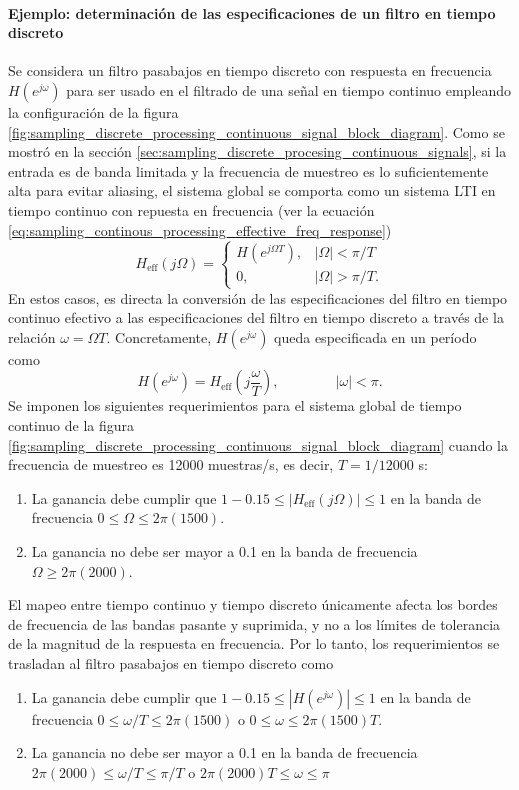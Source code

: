 \documentclass[a4paper]{report}
\begin{document}
\paragraph{Ejemplo: determinación de las especificaciones de un filtro en tiempo discreto} Se considera un filtro pasabajos en tiempo discreto con respuesta en frecuencia \(H(e^{j\omega})\) para ser usado en el filtrado de una señal en tiempo continuo empleando la configuración de la figura \ref{fig:sampling_discrete_processing_continuous_signal_block_diagram}. Como se mostró en la sección \ref{sec:sampling_discrete_procesing_continuous_signals}, si la entrada es de banda limitada y la frecuencia de muestreo es lo suficientemente alta para evitar aliasing, el sistema global se comporta como un sistema LTI en tiempo continuo con repuesta en frecuencia (ver la ecuación \ref{eq:sampling_continous_processing_effective_freq_response})
\[
 H_\textrm{eff}(j\Omega)
 =\left\{
  \begin{array}{ll}
   H(e^{j\Omega T}), & |\Omega|<\pi/T \\
   0, & |\Omega|>\pi/T.
  \end{array}
  \right. 
\]
En estos casos, es directa la conversión de las especificaciones del filtro en tiempo continuo efectivo a las especificaciones del filtro en tiempo discreto a través de la relación \(\omega=\Omega T\). Concretamente, \(H(e^{j\omega})\) queda especificada en un período como
\[
 H(e^{j\omega})=H_\textrm{eff}\left(j\frac{\omega}{T}\right),
 \qquad\qquad 
 |\omega|<\pi.
\]
Se imponen los siguientes requerimientos para el sistema global de tiempo continuo de la figura \ref{fig:sampling_discrete_processing_continuous_signal_block_diagram} cuando la frecuencia de muestreo es 12000 muestras/s, es decir, \(T=1/12000\) s:
\begin{enumerate}
 \item La ganancia debe cumplir que \(1-0.15\leq|H_\textrm{eff}(j\Omega)|\leq1\) en la banda de frecuencia \(0\leq\Omega\leq2\pi(1500)\).
 \item La ganancia no debe ser mayor a 0.1 en la banda de frecuencia \(\Omega\geq2\pi(2000)\). 
\end{enumerate}
El mapeo entre tiempo continuo y tiempo discreto únicamente afecta los bordes de frecuencia de las bandas pasante y suprimida, y no a los límites de tolerancia de la magnitud de la respuesta en frecuencia. Por lo tanto, los requerimientos se trasladan al filtro pasabajos en tiempo discreto como
\begin{enumerate}
 \item La ganancia debe cumplir que \(1-0.15\leq|H(e^{j\omega})|\leq1\) en la banda de frecuencia \(0\leq\omega/T\leq2\pi(1500)\) o \(0\leq\omega\leq2\pi(1500)T\).
 \item La ganancia no debe ser mayor a 0.1 en la banda de frecuencia \(2\pi(2000)\leq\omega/T\leq\pi/T\) o \(2\pi(2000)T\leq\omega\leq\pi\) 
\end{enumerate}
\end{document}
